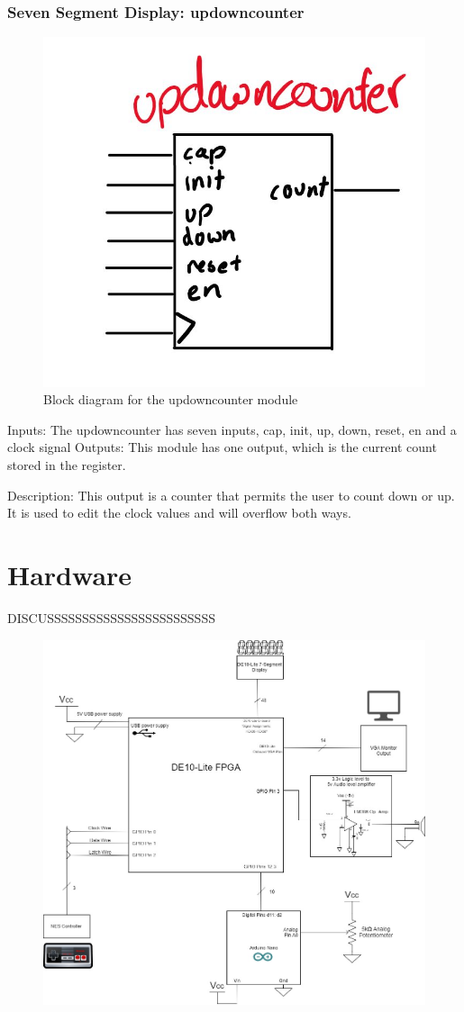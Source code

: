 \documentclass[a4paper]{article}
\begin{document}
\subsubsection{Seven Segment Display: updowncounter}
\begin{figure}[H]
    \includegraphics[width=0.8 \linewidth]{images/updowncounter.JPG}
    \caption{Block diagram for the updowncounter module}
    \label{updowncounter}
\end{figure}

Inputs: The updowncounter has seven inputs, cap, init, up, down, reset, en and a clock signal
Outputs: This module has one output, which is the current count stored in the register.

Description: This output is a counter that permits the user to count down or up. It is used to edit the clock values and will overflow both ways.

\section{Hardware}%

DISCUSSSSSSSSSSSSSSSSSSSSSSSS
\begin{figure}[H]
    \includegraphics[width=0.8 \linewidth]{images/hardwareDiagram.jpg}
    \caption{ }
    \label{hardware}
\end{figure}
\end{document}
